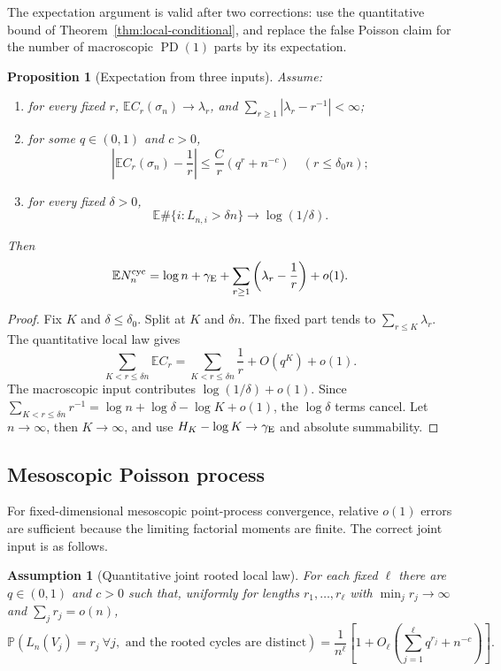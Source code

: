 \documentclass[11pt]{article}
\newcommand{\E}{\mathbb E}
\newcommand{\Pp}{\mathbb P}
\newcommand{\1}{\mathbf 1}
\newcommand{\PD}{\operatorname{PD}(1)}
\newcommand{\cyc}{\mathrm{cyc}}
\newtheorem{proposition}[theorem]{Proposition}
\newtheorem{assumption}[theorem]{Assumption}
\theoremstyle{remark}
\begin{document}
The expectation argument is valid after two corrections: use the quantitative
bound of Theorem~\ref{thm:local-conditional}, and replace the false Poisson
claim for the number of macroscopic $\PD$ parts by its expectation.

\begin{proposition}[Expectation from three inputs]\label{prop:expectation-correct}
Assume:
\begin{enumerate}[label=(E\arabic*)]
\item for every fixed $r$, $\E C_r(\sigma_n)\to\lambda_r$, and
$\sum_{r\ge1}|\lambda_r-r^{-1}|<\infty$;
\item for some $q\in(0,1)$ and $c>0$,
\[
 \left|\E C_r(\sigma_n)-\frac1r\right|
 \le\frac{C}{r}(q^r+n^{-c})
 \quad (r\le\delta_0n);
\]
\item for every fixed $\delta>0$,
\[
 \E\#\{i:L_{n,i}>\delta n\}\longrightarrow\log(1/\delta).
\]
\end{enumerate}
Then
\[
 \E N_n^{\cyc}=\log n+\gamma_{\rm E}
 +\sum_{r\ge1}\left(\lambda_r-\frac1r\right)+o(1).
\]
\end{proposition}

\begin{proof}
Fix $K$ and $\delta\le\delta_0$.  Split at $K$ and $\delta n$.  The fixed
part tends to $\sum_{r\le K}\lambda_r$.  The quantitative local law gives
\[
 \sum_{K<r\le\delta n}\E C_r
 =\sum_{K<r\le\delta n}\frac1r+O(q^K)+o(1).
\]
The macroscopic input contributes $\log(1/\delta)+o(1)$.  Since
$\sum_{K<r\le\delta n}r^{-1}=\log n+\log\delta-\log K+o(1)$, the
$\log\delta$ terms cancel.  Let $n\to\infty$, then $K\to\infty$, and use
$H_K-\log K\to\gamma_{\rm E}$ and absolute summability.
\end{proof}

\subsection{Mesoscopic Poisson process}

For fixed-dimensional mesoscopic point-process convergence, relative
$o(1)$ errors are sufficient because the limiting factorial moments are
finite.  The correct joint input is as follows.

\begin{assumption}[Quantitative joint rooted local law]\label{ass:joint}
For each fixed $\ell$ there are $q\in(0,1)$ and $c>0$ such that, uniformly for
lengths $r_1,\dots,r_\ell$ with $\min_jr_j\to\infty$ and
$\sum_jr_j=o(n)$,
\begin{equation}\label{eq:joint-correct}
 \Pp\left(
  L_n(V_j)=r_j\ \forall j,
  \text{ and the rooted cycles are distinct}
 \right)
 =\frac1{n^\ell}\left[
 1+O_\ell\left(\sum_{j=1}^\ell q^{r_j}+n^{-c}\right)
 \right].
\end{equation}
\end{assumption}
\end{document}
